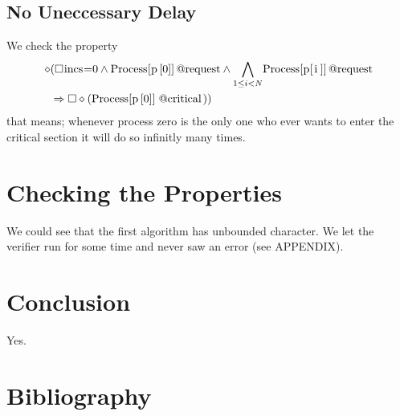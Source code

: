 \documentclass{llncs}
\begin{document}
\subsection{No Uneccessary Delay}

We check the property
\begin{eqnarray}
    \diamond & ( \square \text{\lstinline|incs|=0} \land \text{\lstinline|Process[p[0]]@request|} \land \underset{1\leq i < N}{\bigwedge} \text{\lstinline|Process[p[i]]@request|}\\
    &\Rightarrow \square \diamond(\text{\lstinline|Process[p[0]]@critical|}))
\end{eqnarray}
that means; whenever process zero is the only one who ever wants to enter the critical section it will do so infinitly many times.

\section{Checking the Properties}

We could see that the first algorithm has unbounded character. We let the verifier run for some time
and never saw an error (see APPENDIX).


\section{Conclusion}

Yes.

\section{Bibliography}



\end{document}

